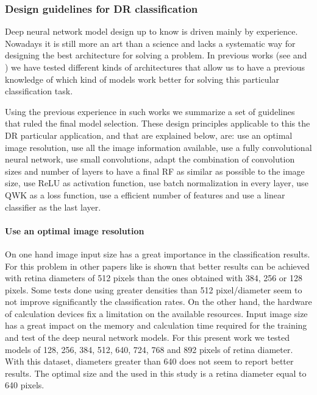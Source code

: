 \documentclass[preprint]{elsarticle}
\theoremstyle{definition} %
\theoremstyle{remark}
\begin{document}
\subsubsection{Design guidelines for DR classification}

Deep neural network model design up to know is driven mainly by experience. Nowadays it is still more an art than a science and lacks a systematic way for designing the best architecture for solving a problem. In previous works (see \cite{jdelatorre-2016} and \cite{jdelatorre-2017}) we have tested different kinds of architectures that allow us to have a previous knowledge of which kind of models work better for solving this particular classification task.

Using the previous experience in such works we summarize a set of guidelines that ruled the final model selection. These design principles applicable to this the DR particular application, and that are explained below, are: use an optimal image resolution, use all the image information available, use a fully convolutional neural network, use small convolutions, adapt the combination of convolution sizes and number of layers to have a final RF as similar as possible to the image size, use ReLU as activation function, use batch normalization in every layer, use QWK as a loss function, use a efficient number of features and use a linear classifier as the last layer.

\paragraph{Use an optimal image resolution} On one hand image input size has a great importance in the classification results. For this problem in other papers like \cite{jdelatorre-2016} is shown that better results can be achieved with retina diameters of 512 pixels than the ones obtained with 384, 256 or 128 pixels. Some tests done using greater densities than 512 pixel/diameter seem to not improve significantly the classification rates. On the other hand, the hardware of calculation devices fix a limitation on the available resources. Input image size has a great impact on the memory and calculation time required for the training and test of the deep neural network models. For this present work we tested models of 128, 256, 384, 512, 640, 724, 768 and 892 pixels of retina diameter. With this dataset, diameters greater than 640 does not seem to report better results. The optimal size and the used in this study is a retina diameter equal to 640 pixels.
\end{document}
